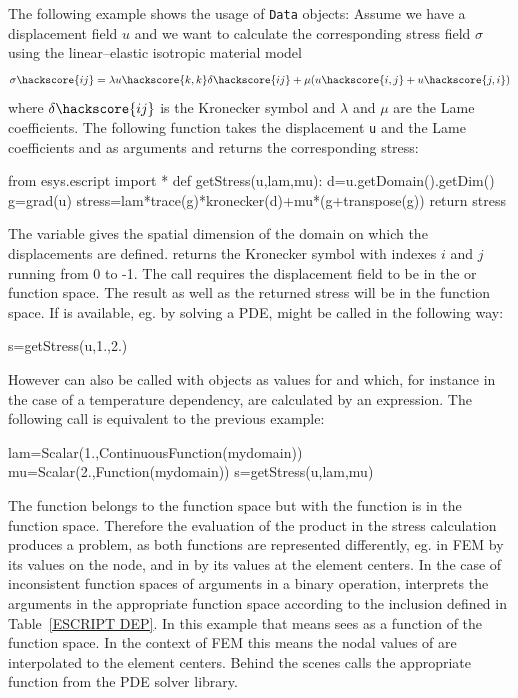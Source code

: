 The following example shows the usage of {\tt Data} objects: Assume we have a
displacement field $u$ and we want to calculate the corresponding stress field
$\sigma$ using the linear--elastic isotropic material model
\begin{eqnarray}\label{eq: linear elastic stress}
\sigma\hackscore {ij}=\lambda u\hackscore {k,k} \delta\hackscore {ij} + \mu ( u\hackscore {i,j} + u\hackscore {j,i})
\end{eqnarray}
where $\delta\hackscore {ij}$ is the Kronecker symbol and 
$\lambda$ and $\mu$ are the Lame coefficients. The following function
takes the displacement {\tt u} and the Lame coefficients
 and  as arguments and returns the corresponding stress:
\begin{python}
from esys.escript import *
def getStress(u,lam,mu):
  d=u.getDomain().getDim()
  g=grad(u)
  stress=lam*trace(g)*kronecker(d)+mu*(g+transpose(g))
  return stress     
\end{python}
The variable 
 gives the spatial dimension of the 
domain on which the displacements are defined.
 returns the Kronecker symbol with indexes 
$i$ and $j$ running from $0$ to -1. The call  requires 
the displacement field  to be in the  or \ContinuousFunction
function space. The result  as well as the returned stress will be in the \Function function space. 
If  is available, eg. by solving a PDE,  might be called
in the following way:
\begin{python}
s=getStress(u,1.,2.)
\end{python}
However  can also be called with \Data objects as values for
 and  which,
for instance in the case of a temperature dependency, are calculated by an expression. 
The following call is equivalent to the previous example:
\begin{python}
lam=Scalar(1.,ContinuousFunction(mydomain))
mu=Scalar(2.,Function(mydomain))
s=getStress(u,lam,mu)
\end{python}
The function  belongs to the \ContinuousFunction function space
but with  the function  is in the \Function function space.
Therefore the evaluation of the product  in the stress calculation 
produces a problem, as both functions are represented differently, eg. in FEM
 by its values on the node, and in  by its values at the element centers.
In the case of inconsistent function spaces of arguments in a binary operation, \escript 
interprets the arguments in the appropriate function space according to the inclusion 
defined in Table~\ref{ESCRIPT DEP}. In this example that means
 \escript sees  as a function of the \Function function space. 
In the context of FEM this means the nodal values of 
 are interpolated to the element centers. Behind the scenes
\escript calls the appropriate function from the PDE solver library.

